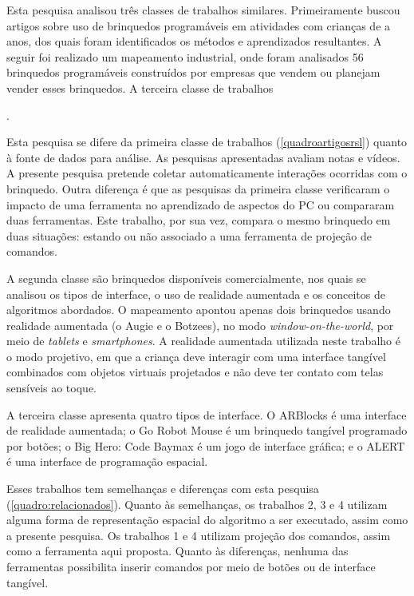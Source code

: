 {{}

Esta pesquisa analisou três classes de trabalhos similares. Primeiramente buscou artigos sobre uso de brinquedos programáveis em atividades com crianças de \idadeinicial a \idadefinal anos, dos quais foram identificados os métodos e aprendizados resultantes. A seguir foi realizado um mapeamento industrial, onde foram analisados 56 brinquedos programáveis construídos por empresas que vendem ou planejam vender esses brinquedos. A terceira classe de trabalhos

.

Esta pesquisa se difere da primeira classe de trabalhos (\autoref{quadroartigosrsl}) quanto à fonte de dados para análise. As pesquisas apresentadas avaliam notas e vídeos. A presente pesquisa pretende coletar automaticamente interações ocorridas com o brinquedo. Outra diferença é que as pesquisas da primeira classe verificaram o impacto de uma ferramenta no aprendizado de aspectos do PC ou compararam duas ferramentas. Este trabalho, por sua vez, compara o mesmo brinquedo em duas situações: estando ou não associado a uma ferramenta de projeção de comandos.

A segunda classe são brinquedos disponíveis comercialmente, nos quais se analisou os tipos de interface, o uso de realidade aumentada e os conceitos de algoritmos abordados. O mapeamento apontou apenas dois brinquedos usando realidade aumentada (o Augie e o Botzees), no modo \textit{window-on-the-world}, por meio de \textit{tablets} e \textit{smartphones}. A realidade aumentada utilizada neste trabalho é o modo projetivo, em que a criança deve interagir com uma interface tangível combinados com objetos virtuais projetados e não deve ter contato com telas sensíveis ao toque.

A terceira classe apresenta quatro tipos de interface. O ARBlocks é uma interface de realidade aumentada; o Go Robot Mouse é um brinquedo tangível programado por botões; o Big Hero: Code Baymax é um jogo de interface gráfica; e o ALERT é uma interface de programação espacial.

Esses trabalhos tem semelhanças e diferenças com esta pesquisa (\autoref{quadro:relacionados}). Quanto às semelhanças, os trabalhos 2, 3 e 4 utilizam alguma forma de representação espacial do algoritmo a ser executado, assim como a presente pesquisa. Os trabalhos 1 e 4 utilizam projeção dos comandos, assim como a ferramenta aqui proposta. Quanto às diferenças, nenhuma das ferramentas possibilita inserir comandos por meio de botões ou de interface tangível. 

}

